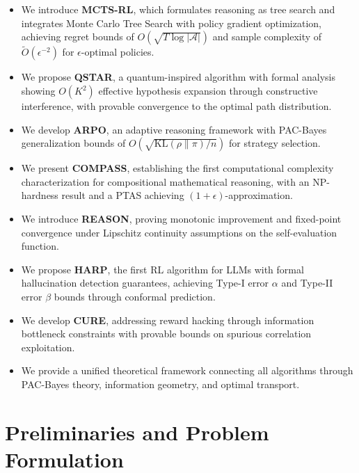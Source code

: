 \documentclass[11pt,a4paper]{article}
\newcommand{\calA}{\mathcal{A}}
\begin{document}
\begin{itemize}
    \item We introduce \textbf{MCTS-RL}, which formulates reasoning as tree search and integrates Monte Carlo Tree Search with policy gradient optimization, achieving regret bounds of $O(\sqrt{T \log |\calA|})$ and sample complexity of $\tilde{O}(\epsilon^{-2})$ for $\epsilon$-optimal policies.
    
    \item We propose \textbf{QSTAR}, a quantum-inspired algorithm with formal analysis showing $O(K^2)$ effective hypothesis expansion through constructive interference, with provable convergence to the optimal path distribution.
    
    \item We develop \textbf{ARPO}, an adaptive reasoning framework with PAC-Bayes generalization bounds of $O(\sqrt{\text{KL}(\rho \| \pi)/n})$ for strategy selection.
    
    \item We present \textbf{COMPASS}, establishing the first computational complexity characterization for compositional mathematical reasoning, with an NP-hardness result and a PTAS achieving $(1+\epsilon)$-approximation.
    
    \item We introduce \textbf{REASON}, proving monotonic improvement and fixed-point convergence under Lipschitz continuity assumptions on the self-evaluation function.
    
    \item We propose \textbf{HARP}, the first RL algorithm for LLMs with formal hallucination detection guarantees, achieving Type-I error $\alpha$ and Type-II error $\beta$ bounds through conformal prediction.
    
    \item We develop \textbf{CURE}, addressing reward hacking through information bottleneck constraints with provable bounds on spurious correlation exploitation.
    
    \item We provide a unified theoretical framework connecting all algorithms through PAC-Bayes theory, information geometry, and optimal transport.
\end{itemize}

\section{Preliminaries and Problem Formulation}
\end{document}
